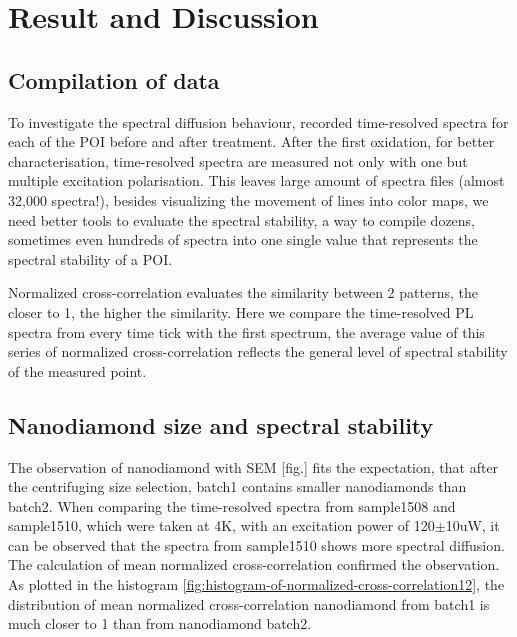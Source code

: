 \chapter{Result and Discussion} %

\label{Chapter2.75} %

\section{Compilation of data}
To investigate the spectral diffusion behaviour, recorded time-resolved spectra for each of the POI before and after treatment. After the first oxidation, for better characterisation, time-resolved spectra are measured not only with one but multiple excitation polarisation. This leaves large amount of spectra files (almost 32,000 spectra!), besides visualizing the movement of lines into color maps, we need better tools to evaluate the spectral stability, a way to compile dozens, sometimes even hundreds of spectra into one single value that represents the spectral stability of a POI.

Normalized cross-correlation evaluates the similarity between 2 patterns, the closer to 1, the higher the similarity. Here we compare the time-resolved PL spectra from every time tick with the first spectrum, the average value of this series of normalized cross-correlation reflects the general level of spectral stability of the measured point.


\section{Nanodiamond size and spectral stability}

The observation of nanodiamond with SEM [fig.] fits the expectation, that after the centrifuging size selection, batch1 contains smaller nanodiamonds than batch2.  
When comparing the time-resolved spectra from sample1508 and sample1510, which were taken at 4K, with an excitation power of 120$\pm$10uW, it can be observed that the spectra from sample1510 shows more spectral diffusion. The calculation of mean normalized cross-correlation confirmed the observation. As plotted in the histogram \ref{fig:histogram-of-normalized-cross-correlation12}, the distribution of mean normalized cross-correlation nanodiamond from batch1 is much closer to 1 than from nanodiamond batch2.

